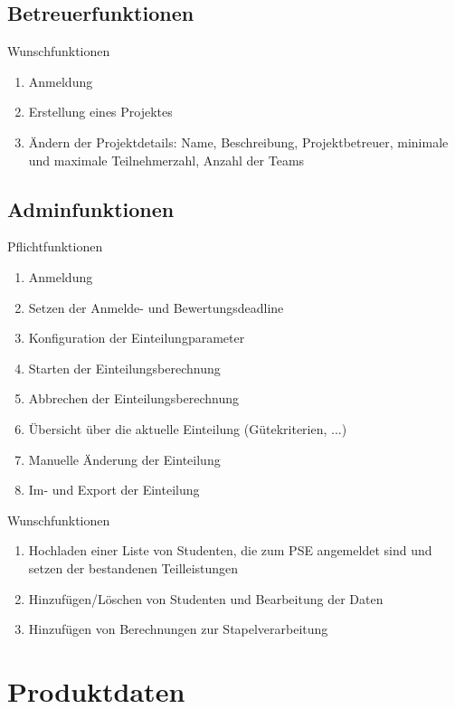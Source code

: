 \documentclass[parskip=full]{scrartcl}
\newcommand{\swtLabel}[1]{\textbf{\textbackslash #1\arabic*0\textbackslash}}
\begin{document}
\subsection{Betreuerfunktionen}

Wunschfunktionen

\begin{enumerate}[label=\swtLabel{FA}, resume]
  \item Anmeldung
  \item Erstellung eines Projektes
  \item Ändern der Projektdetails: Name, Beschreibung, Projektbetreuer, minimale und maximale Teilnehmerzahl, Anzahl der Teams
\end{enumerate}

\subsection{Adminfunktionen}

Pflichtfunktionen

\begin{enumerate}[label=\swtLabel{FA}, resume]
  \item Anmeldung
  \item Setzen der Anmelde- und Bewertungsdeadline
  \item Konfiguration der Einteilungparameter
  \item Starten der Einteilungsberechnung
  \item Abbrechen der Einteilungsberechnung
  \item Übersicht über die aktuelle Einteilung (Gütekriterien, ...)
  \item Manuelle Änderung der Einteilung
  \item Im- und Export der Einteilung
\end{enumerate}

Wunschfunktionen

\begin{enumerate}[label=\swtLabel{FA}, resume]
  \item Hochladen einer Liste von Studenten, die zum PSE angemeldet sind und setzen der bestandenen Teilleistungen
  \item Hinzufügen/Löschen von Studenten und Bearbeitung der Daten
  \item Hinzufügen von Berechnungen zur Stapelverarbeitung
\end{enumerate}

\section{Produktdaten}
\end{document}
